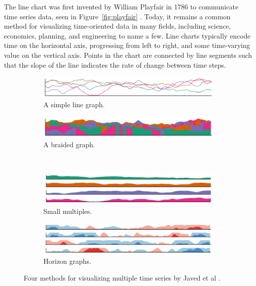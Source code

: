 The line chart was first invented by William Playfair in 1786 to communicate time series data, seen in Figure~\ref{fig:playfair} \cite{playfair}.  Today, it remains a common method for visualizing time-oriented data in many fields, including science, economics, planning, and engineering to name a few.  Line charts typically encode time on the horizontal axis, progressing from left to right, and some time-varying value on the vertical axis.  Points in the chart are connected by line segments such that the slope of the line indicates the rate of change between time steps.  

\begin{figure}
	\centering
	\begin{subfigure}[b]{0.45\textwidth}
		\includegraphics[width=\textwidth]{figures/eps/ts_simplelinegraph.eps}
		\caption{A simple line graph.}
		\label{fig:ts_simple}
	\end{subfigure}
	\begin{subfigure}[b]{0.45\textwidth}
		\includegraphics[width=\textwidth]{figures/eps/ts_braidedgraph.eps}
		\caption{A braided graph.}
		\label{fig:ts_braid}
	\end{subfigure}
	\\
	\begin{subfigure}[b]{0.45\textwidth}
		\includegraphics[width=\textwidth]{figures/eps/ts_smallmultiples.eps}
		\caption{Small multiples.}
		\label{fig:ts_smmult}
	\end{subfigure}
	\begin{subfigure}[b]{0.45\textwidth}
		\includegraphics[width=\textwidth]{figures/eps/ts_horizongraphs.eps}
		\caption{Horizon graphs.}
		\label{fig:ts_horizon}
	\end{subfigure}
	\caption{Four methods for visualizing multiple time series by Javed et al \cite{javed2010}.}
	\label{fig:ts_compare}
\end{figure}

